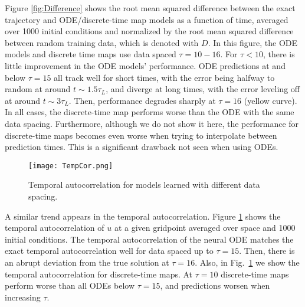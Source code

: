 \documentclass[preprint,aps,pre,letterpaper,onecolumn,superscriptaddress]{revtex4-2} %
\begin{document}
Figure \ref{fig:Difference} shows the root mean squared difference between the exact trajectory and ODE/discrete-time map models as a function of time, averaged over 1000 initial conditions and normalized by the root mean squared difference between random training data, which is denoted with $D$. In this figure, the ODE models and discrete time maps use data spaced $\tau=10-16$. For $\tau<10$, there is little improvement in the ODE models' performance.
ODE predictions at and below $\tau=15$ all track well for short times, with the error being halfway to random at around $t\sim 1.5\tau_L$, and diverge at long times, with the error leveling off at around $t\sim 3\tau_L$. %
Then, performance degrades sharply at $\tau=16$ (yellow curve). 
In all cases, the discrete-time map performs worse than the ODE with the same data spacing. Furthermore, although we do not show it here, the performance for discrete-time maps becomes even worse when trying to interpolate between prediction times. This is a significant drawback not seen when using ODEs.


\begin{figure} 
	\texttt{[image: TempCor.png]}
	\caption{Temporal autocorrelation for models learned with different data spacing.}
	\label{fig:TempCor}
\end{figure} 


A similar trend appears in the temporal autocorrelation. Figure \ref{fig:TempCor} shows the temporal autocorrelation of $u$ at a given gridpoint averaged over space and 1000 initial conditions.
The temporal autocorrelation of the neural ODE matches the exact temporal autocorrelation well for data spaced up to $\tau=15$. Then, there is an abrupt deviation from the true solution at $\tau=16$. 
Also, in Fig.\ \ref{fig:TempCor} we show the temporal autocorrelation for discrete-time maps. At $\tau=10$ discrete-time maps perform worse than all ODEs below $\tau=15$, and predictions worsen when increasing $\tau$.
\end{document}

